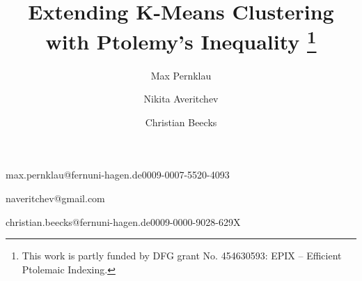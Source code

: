 







\title[Extending K-Means Clustering with Ptolemy’s Inequality]{Extending K-Means Clustering with Ptolemy’s Inequality
	\thanks{This work is partly funded by DFG grant No. 454630593: EPIX – Efficient Ptolemaic Indexing.}
}
\author[1]{Max Pernklau}{max.pernklau@fernuni-hagen.de}{0009-0007-5520-4093}
\author[1]{Nikita Averitchev}{naveritchev@gmail.com}{}
\author[1]{Christian Beecks}{christian.beecks@fernuni-hagen.de}{0009-0000-9028-629X}



